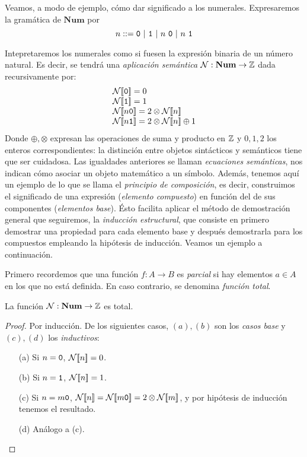 Veamos, a modo de ejemplo, cómo dar significado a los numerales. Expresaremos la gramática de $\mathbf{Num}$ por
\[
    n ::= \n{0}\ |\ \n{1} \ |\ n\ \n{0} \ |\ n\ \n{1}
\]

Intepretaremos los numerales como si fuesen la expresión binaria de un número natural. Es decir, se tendrá una \textit{aplicación semántica} $\mathcal{N}: \mathbf{Num} \to \mathbb{Z}$ dada recursivamente por:
\[
    \begin{array}{l}
         \fc{\mc{N}}{\n{0}} = 0 \\
         \fc{\mc{N}}{\n{1}}= 1 \\
         \fc{\mc{N}}{n \n{0}} = 2\otimes \fc{\mc{N}}{n}\\
         \fc{\mc{N}}{n \n{1}} = 2\otimes \fc{\mc{N}}{n} \oplus 1
    \end{array}
\]
Donde $\oplus, \otimes$ expresan las operaciones de suma y producto en $\mathbb{Z}$ y $0, 1, 2$ los enteros correspondientes: la distinción entre objetos sintácticos y semánticos tiene que ser cuidadosa. Las igualdades anteriores se llaman \textit{ecuaciones semánticas}, nos indican cómo asociar un objeto matemático a un símbolo. Además, tenemos aquí un ejemplo de lo que se llama el \textit{principio de composición}, es decir, construimos el significado de una expresión (\textit{elemento compuesto}) en función del de sus componentes (\textit{elementos base}). Ésto facilita aplicar el método de demostración general que seguiremos, la \textit{inducción estructural}, que consiste en primero demostrar una propiedad para cada elemento base y después demostrarla para los compuestos empleando la hipótesis de inducción. Veamos un ejemplo a continuación.

Primero recordemos que una función $f: A \rightarrow B$ es \textit{parcial} si hay elementos $a\in A$ en los que no está definida. En caso contrario, se denomina \textit{función total}.

\begin{prop}
La función $\mathcal{N}: \mathbf{Num} \to \mathbb{Z}$ es total.
\end{prop}
\begin{proof}
Por inducción. De los siguientes casos, $(a), (b)$ son los \textit{casos base} y $(c), (d)$ los \textit{inductivos}:
\begin{itemize}
    \item[(a)] Si $n = \texttt{0}$, $\mathcal{N}[\![n]\!] = 0$.
    \item[(b)] Si $n = \texttt{1}$, $\mathcal{N}[\![n]\!] = 1$.
    \item[(c)] Si $n = m\texttt{0}$, $\mathcal{N}[\![n]\!] = \mathcal{N}[\![m\texttt{0}]\!] = 2 \otimes \mathcal{N}[\![m]\!]$, y por hipótesis de inducción tenemos el resultado.
    \item[(d)] Análogo a (c).
\end{itemize}
\end{proof}

